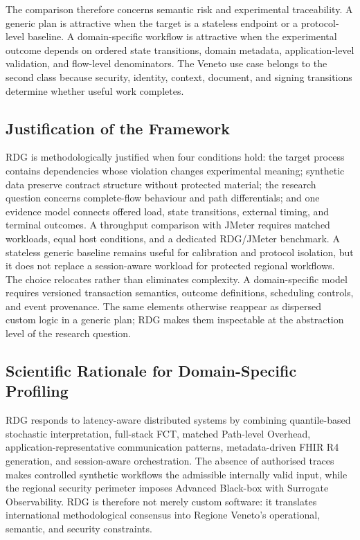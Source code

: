 \noindent The comparison therefore concerns semantic risk and experimental
traceability. A generic plan is attractive when the target is a stateless endpoint
or a protocol-level baseline. A domain-specific workflow is attractive when the
experimental outcome depends on ordered state transitions, domain metadata,
application-level validation, and flow-level denominators. The Veneto use case
belongs to the second class because security, identity, context, document, and
signing transitions determine whether useful work completes.

\subsection[Justification of the Framework]
{Justification of the Framework}

\noindent RDG is methodologically justified when four conditions hold: the target process
contains dependencies whose violation changes experimental meaning; synthetic
data preserve contract structure without protected material; the research
question concerns complete-flow behaviour and path differentials; and one
evidence model connects offered load, state transitions, external timing, and
terminal outcomes. A throughput comparison
with JMeter requires matched workloads, equal host conditions, and a dedicated
RDG/JMeter benchmark. A stateless generic baseline remains useful for calibration and protocol isolation, but it does not
replace a session-aware workload for protected regional workflows. The choice relocates rather than eliminates complexity. A domain-specific model
requires versioned transaction semantics, outcome definitions, scheduling
controls, and event provenance. The same elements otherwise reappear as dispersed
custom logic in a generic plan; RDG makes them inspectable at the abstraction
level of the research question.

\subsection{Scientific Rationale for Domain-Specific Profiling}
\noindent RDG responds to latency-aware distributed systems by combining quantile-based
stochastic interpretation, full-stack FCT, matched Path-level Overhead,
application-representative communication patterns, metadata-driven FHIR R4
generation, and session-aware orchestration. The absence of authorised traces
makes controlled synthetic workflows the admissible internally valid input,
while the regional security perimeter imposes Advanced Black-box with Surrogate
Observability. RDG is therefore not merely custom software: it translates
international methodological consensus into Regione Veneto's operational,
semantic, and security constraints.

